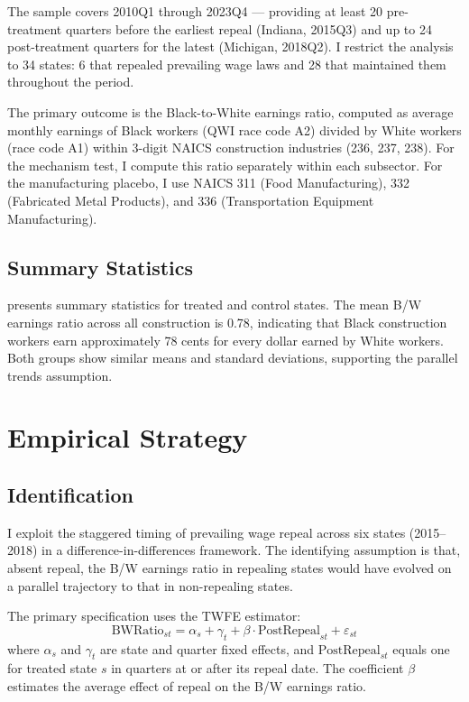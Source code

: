 \documentclass[12pt]{article}
\begin{document}
The sample covers 2010Q1 through 2023Q4 --- providing at least 20 pre-treatment quarters before the earliest repeal (Indiana, 2015Q3) and up to 24 post-treatment quarters for the latest (Michigan, 2018Q2). I restrict the analysis to 34 states: 6 that repealed prevailing wage laws and 28 that maintained them throughout the period.

The primary outcome is the Black-to-White earnings ratio, computed as average monthly earnings of Black workers (QWI race code A2) divided by White workers (race code A1) within 3-digit NAICS construction industries (236, 237, 238). For the mechanism test, I compute this ratio separately within each subsector. For the manufacturing placebo, I use NAICS 311 (Food Manufacturing), 332 (Fabricated Metal Products), and 336 (Transportation Equipment Manufacturing).

\subsection{Summary Statistics}



 presents summary statistics for treated and control states. The mean B/W earnings ratio across all construction is 0.78, indicating that Black construction workers earn approximately 78 cents for every dollar earned by White workers. Both groups show similar means and standard deviations, supporting the parallel trends assumption.


\section{Empirical Strategy}

\subsection{Identification}

I exploit the staggered timing of prevailing wage repeal across six states (2015--2018) in a difference-in-differences framework. The identifying assumption is that, absent repeal, the B/W earnings ratio in repealing states would have evolved on a parallel trajectory to that in non-repealing states.

The primary specification uses the TWFE estimator:
\begin{equation}
\text{BWRatio}_{st} = \alpha_s + \gamma_t + \beta \cdot \text{PostRepeal}_{st} + \varepsilon_{st}
\label{eq:twfe}
\end{equation}
where $\alpha_s$ and $\gamma_t$ are state and quarter fixed effects, and $\text{PostRepeal}_{st}$ equals one for treated state $s$ in quarters at or after its repeal date. The coefficient $\beta$ estimates the average effect of repeal on the B/W earnings ratio.
\end{document}
